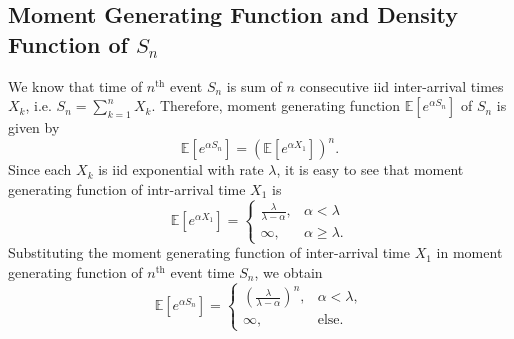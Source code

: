 \documentclass[a4paper,10pt]{article}
\theoremstyle{plain}
\theoremstyle{definition}
\begin{document}
\subsection{Moment Generating Function and Density Function of $S_n$}
We know that time of $n^{\mathrm{th}}$ event $S_n$ is sum of $n$ consecutive iid inter-arrival times $X_k$, i.e. $S_n = \sum^{n}_{k=1}X_{k}$. Therefore, moment generating function $\mathbb{E} [ e^{\alpha S_{n}} ]$ of $S_n$ is given by 
 \begin{equation*}
  \mathbb{E} [ e^{\alpha S_{n}} ] = \left(\mathbb{E}[e^{\alpha X_{1}}]\right)^{n}. 
 \end{equation*} 
Since each $X_k$ is iid exponential with rate $\lambda$, it is easy to see that moment generating function of intr-arrival time $X_1$ is 
 \begin{equation*}
  \mathbb{E} [ e^{\alpha X_1} ] = 
		\begin{cases}
		\frac{\lambda}{\lambda-\alpha}, & \alpha < \lambda \\
		\infty, & \alpha \geq \lambda.
		\end{cases} 
 \end{equation*} 
Substituting the moment generating function of inter-arrival time $X_1$ in moment generating function of $n^{\mathrm{th}}$ event time $S_n$, we obtain
\begin{equation*}
   \mathbb{E}[e^{\alpha S_{n}}] = 
	\begin{cases} 
	\left(\frac{\lambda}{\lambda-\alpha}\right)^{n}, & \alpha < \lambda, \\
   \infty, &\text{else}.
	\end{cases}
\end{equation*}
\end{document}
